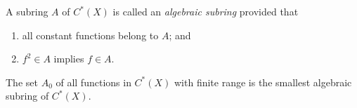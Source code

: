 A subring $A$ of $C^*(X)$ is called an \textit{algebraic subring} provided that
\begin{enumerate}
\item[(i)] all constant functions belong to $A$; and
\item[(ii)] $f^2 \in A$ implies $f \in A$.
\end{enumerate}
The set $A_0$ of all functions in $C^*(X)$ with finite range is the smallest algebraic subring of $C^*(X)$.
